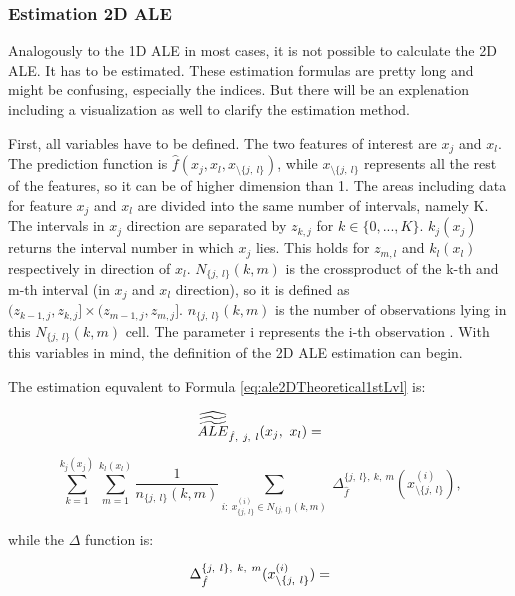 \documentclass[]{krantz}
\begin{document}
\subsubsection{Estimation 2D ALE}\label{estimation-2d-ale}

Analogously to the 1D ALE in most cases, it is not possible to calculate
the 2D ALE. It has to be estimated. These estimation formulas are pretty
long and might be confusing, especially the indices. But there will be
an explenation including a visualization as well to clarify the
estimation method.

First, all variables have to be defined. The two features of interest
are \(x_j\) and \(x_l\). The prediction function is
\(\hat{f}(x_j, x_l, x_{\setminus\{j,~l\}})\), while
\(x_{\setminus\{j,~l\}}\) represents all the rest of the features, so it
can be of higher dimension than 1. The areas including data for feature
\(x_j\) and \(x_l\) are divided into the same number of intervals,
namely K. The intervals in \(x_j\) direction are separated by
\(z_{k,j}\) for \(k \in \{0,...,K\}\). \(k_j(x_j)\) returns the interval
number in which \(x_j\) lies. This holds for \(z_{m,l}\) and
\(k_l(x_l)\) respectively in direction of \(x_l\). \(N_{\{j,~l\}}(k,m)\)
is the crossproduct of the k-th and m-th interval (in \(x_j\) and
\(x_l\) direction), so it is defined as
\((z_{k-1,j}, z_{k,j}] \times (z_{m-1,j}, z_{m,j}]\).
\(n_{\{j,~l\}}(k,m)\) is the number of observations lying in this
\(N_{\{j,~l\}}(k,m)\) cell. The parameter i represents the i-th
observation \citep{Apley2016}. With this variables in mind, the
definition of the 2D ALE estimation can begin.

The estimation equvalent to Formula \eqref{eq:ale2DTheoretical1stLvl} is:

\begin{equation} 
\widehat{\widetilde{\widetilde{ALE}}}_{\hat{f},~j,~l}(x_j, ~x_l) = \notag
\end{equation}

\begin{equation}
\sum_{k=1}^{k_j(x_j)} \sum_{m=1}^{k_l(x_l)}   \frac{1}{n_{\{j,~l\}}(k,m)}\sum_{i:~x_{\{j,~l\}}^{(i)}\in N_{\{j,~l\}}(k,m)} ~ \Delta_{\hat f}^{{\{j,~l\}}, ~k,~m} (x_{\setminus\{j,~l\}}^{(i)}),
  \label{eq:ale2DEst1stLvl}
\end{equation}

while the \(\Delta\) function is:

\begin{equation}
\Delta_{\hat f}^{{\{j,~l\}}, ~k,~m} (x_{\setminus\{j,~l\}}^{(i)}) = \notag
\end{equation}
\end{document}
